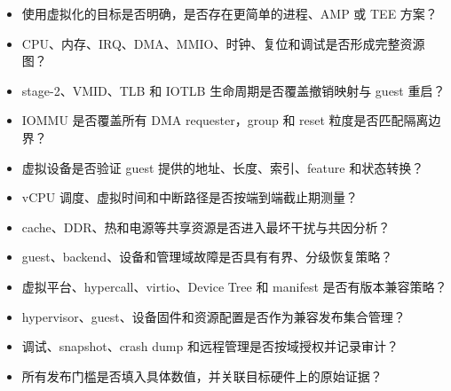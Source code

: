\begin{itemize}
  \item 使用虚拟化的目标是否明确，是否存在更简单的进程、AMP 或 TEE 方案？
  \item CPU、内存、IRQ、DMA、MMIO、时钟、复位和调试是否形成完整资源图？
  \item stage-2、VMID、TLB 和 IOTLB 生命周期是否覆盖撤销映射与 guest 重启？
  \item IOMMU 是否覆盖所有 DMA requester，group 和 reset 粒度是否匹配隔离边界？
  \item 虚拟设备是否验证 guest 提供的地址、长度、索引、feature 和状态转换？
  \item vCPU 调度、虚拟时间和中断路径是否按端到端截止期测量？
  \item cache、DDR、热和电源等共享资源是否进入最坏干扰与共因分析？
  \item guest、backend、设备和管理域故障是否具有有界、分级恢复策略？
  \item 虚拟平台、hypercall、virtio、Device Tree 和 manifest 是否有版本兼容策略？
  \item hypervisor、guest、设备固件和资源配置是否作为兼容发布集合管理？
  \item 调试、snapshot、crash dump 和远程管理是否按域授权并记录审计？
  \item 所有发布门槛是否填入具体数值，并关联目标硬件上的原始证据？
\end{itemize}

